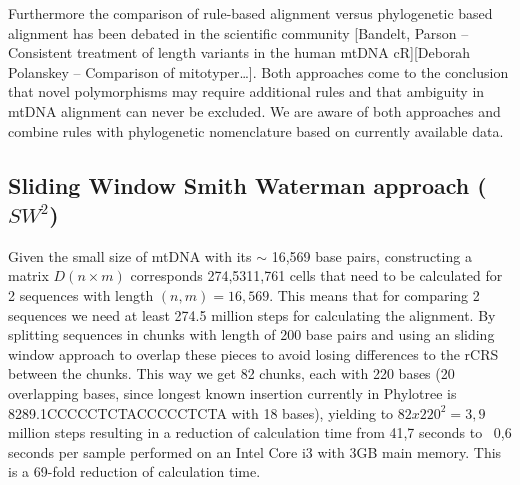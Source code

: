 Furthermore the comparison of rule-based alignment versus phylogenetic based alignment has been debated in the scientific community [Bandelt, Parson – Consistent treatment of length variants in the human mtDNA cR][Deborah Polanskey – Comparison of mitotyper…]. Both approaches come to the conclusion that novel polymorphisms may require additional rules and that ambiguity in mtDNA alignment can never be excluded. We are aware of both approaches and combine rules with phylogenetic nomenclature based on currently available data.
\subsection{Sliding Window Smith Waterman approach ($SW^{2}$)}
Given the small size of mtDNA with its $\sim$ 16,569 base pairs, constructing a matrix $D(n \times m)$ corresponds 274,5311,761 cells that need to be calculated for 2 sequences with length $(n,m) = 16,569$. This means that for comparing 2 sequences we need at least 274.5 million steps for calculating the alignment. By splitting sequences in chunks with length of 200 base pairs and using an sliding window approach to overlap these pieces to avoid losing differences to the rCRS between the chunks. This way we get 82 chunks, each with 220 bases (20 overlapping bases, since longest known insertion currently in Phylotree is 8289.1CCCCCTCTACCCCCTCTA with 18 bases), yielding to $82 x 220^2 = 3,9$ million steps resulting in a reduction of calculation time from 41,7 seconds to ~0,6 seconds per sample performed on an Intel Core i3 with 3GB main memory. This is a 69-fold reduction of calculation time. 

